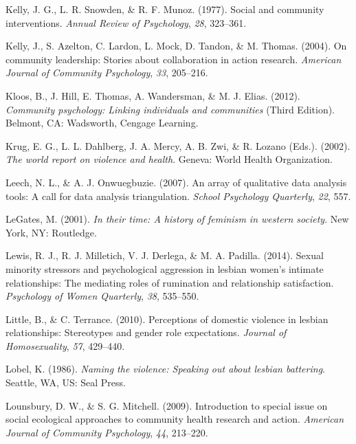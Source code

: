 \documentclass[11pt,]{tufte-book}
\begin{document}
\hypertarget{ref-kelly1977social}{}
Kelly, J. G., L. R. Snowden, \& R. F. Munoz. (1977). Social and
community interventions. \emph{Annual Review of Psychology}, \emph{28},
323--361.

\hypertarget{ref-kelly2004community}{}
Kelly, J., S. Azelton, C. Lardon, L. Mock, D. Tandon, \& M. Thomas.
(2004). On community leadership: Stories about collaboration in action
research. \emph{American Journal of Community Psychology}, \emph{33},
205--216.

\hypertarget{ref-kloos2012community}{}
Kloos, B., J. Hill, E. Thomas, A. Wandersman, \& M. J. Elias. (2012).
\emph{Community psychology: Linking individuals and communities} (Third
Edition). Belmont, CA: Wadsworth, Cengage Learning.

\hypertarget{ref-krug2002world}{}
Krug, E. G., L. L. Dahlberg, J. A. Mercy, A. B. Zwi, \& R. Lozano
(Eds.). (2002). \emph{The world report on violence and health}. Geneva:
World Health Organization.

\hypertarget{ref-leech2007array}{}
Leech, N. L., \& A. J. Onwuegbuzie. (2007). An array of qualitative data
analysis tools: A call for data analysis triangulation. \emph{School
Psychology Quarterly}, \emph{22}, 557.

\hypertarget{ref-legates2001their}{}
LeGates, M. (2001). \emph{In their time: A history of feminism in
western society}. New York, NY: Routledge.

\hypertarget{ref-lewis2014sexual}{}
Lewis, R. J., R. J. Milletich, V. J. Derlega, \& M. A. Padilla. (2014).
Sexual minority stressors and psychological aggression in lesbian
women's intimate relationships: The mediating roles of rumination and
relationship satisfaction. \emph{Psychology of Women Quarterly},
\emph{38}, 535--550.

\hypertarget{ref-little2010perceptions}{}
Little, B., \& C. Terrance. (2010). Perceptions of domestic violence in
lesbian relationships: Stereotypes and gender role expectations.
\emph{Journal of Homosexuality}, \emph{57}, 429--440.

\hypertarget{ref-lobel1986naming}{}
Lobel, K. (1986). \emph{Naming the violence: Speaking out about lesbian
battering}. Seattle, WA, US: Seal Press.

\hypertarget{ref-lounsbury2009introduction}{}
Lounsbury, D. W., \& S. G. Mitchell. (2009). Introduction to special
issue on social ecological approaches to community health research and
action. \emph{American Journal of Community Psychology}, \emph{44},
213--220.
\end{document}
